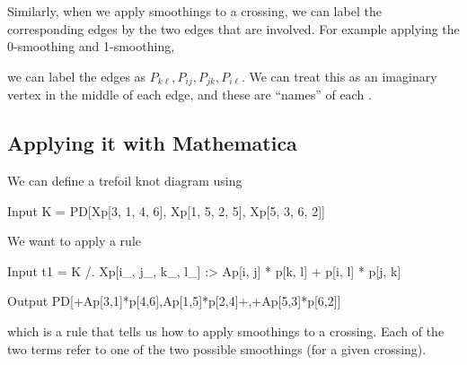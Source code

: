 \documentclass{article}
\begin{document}
Similarly, when we apply smoothings to a crossing, we can label the corresponding edges by the two edges that are involved. For example applying the 0-smoothing and 1-smoothing,
\begin{center}
\end{center}
we can label the edges as $P_{k\ell},P_{ij},P_{jk},P_{i\ell}$. We can treat this as an imaginary vertex in the middle of each edge, and these are ``names'' of each .
\subsection{Applying it with Mathematica}
We can define a trefoil knot diagram using
\begin{mmaCell}{Input}
    K = PD[Xp[3, 1, 4, 6], Xp[1, 5, 2, 5], Xp[5, 3, 6, 2]] 
\end{mmaCell}
We want to apply a rule
\begin{mmaCell}{Input}
    t1 = K /. {Xp[i_, j_, k_, l_] :> Ap[i, j] * p[k, l] + p[i, l] * p[j, k]}
\end{mmaCell}
\begin{mmaCell}{Output}
    PD[+Ap[3,1]*p[4,6],Ap[1,5]*p[2,4]+,+Ap[5,3]*p[6,2]]
\end{mmaCell}
which is a rule that tells us how to apply smoothings to a crossing. Each of the two terms refer to one of the two possible smoothings (for a given crossing).
\end{document}
